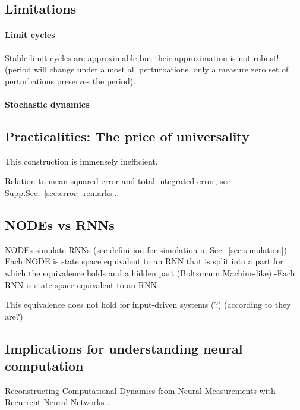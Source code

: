 \documentclass{article}
\theoremstyle{definition} \newtheorem{definition}{Definition}
\theoremstyle{remark} \newtheorem{remark}{Remark}
\newcounter{ct}
\begin{document}
\subsection{Limitations}
\paragraph{Limit cycles}
Stable limit cycles are approximable but their approximation is not robust! (period will change under almost all perturbations, only a measure zero set of perturbations preserves the period).


\paragraph{Stochastic dynamics}
\citep{chen2022universal} 
\citep{wei2022statistically}
\citep{bishop2023recurrent}


\subsection{Practicalities: The price of universality}
This construction is immensely inefficient.

Relation to mean squared error and total integrated error, see Supp.Sec.~\ref{sec:error_remarks}.


\subsection{NODEs vs RNNs}
NODEs simulate RNNs (see definition for simulation in Sec.~\ref{sec:simulation})
- Each NODE is state space equivalent to an RNN that is split into a part for which the equivalence holds and a hidden part (Boltzmann Machine-like)
-Each RNN is state space equivalent to an RNN

This equivalence does not hold for input-driven systems (?)  (according to \citep{dinc2025latentcomputing} they are?)



\subsection{Implications for understanding neural computation} 
Reconstructing Computational Dynamics from Neural Measurements with Recurrent Neural Networks \citep{durstewitz2023reconstructing}.
\end{document}
